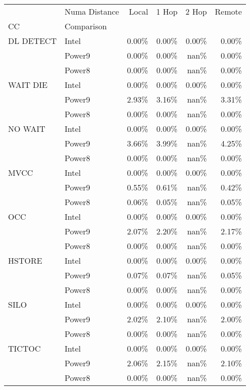 \begin{tabular}{llrrrr}
\toprule
       & Numa Distance &  Local &  1 Hop &  2 Hop &  Remote \\
CC & Comparison &        &        &        &         \\
\midrule
DL DETECT & Intel &  0.00\% &  0.00\% &  0.00\% &   0.00\% \\
       & Power9 &  0.00\% &  0.00\% &   nan\% &   0.00\% \\
       & Power8 &  0.00\% &  0.00\% &   nan\% &   0.00\% \\
WAIT DIE & Intel &  0.00\% &  0.00\% &  0.00\% &   0.00\% \\
       & Power9 &  2.93\% &  3.16\% &   nan\% &   3.31\% \\
       & Power8 &  0.00\% &  0.00\% &   nan\% &   0.00\% \\
NO WAIT & Intel &  0.00\% &  0.00\% &  0.00\% &   0.00\% \\
       & Power9 &  3.66\% &  3.99\% &   nan\% &   4.25\% \\
       & Power8 &  0.00\% &  0.00\% &   nan\% &   0.00\% \\
MVCC & Intel &  0.00\% &  0.00\% &  0.00\% &   0.00\% \\
       & Power9 &  0.55\% &  0.61\% &   nan\% &   0.42\% \\
       & Power8 &  0.06\% &  0.05\% &   nan\% &   0.05\% \\
OCC & Intel &  0.00\% &  0.00\% &  0.00\% &   0.00\% \\
       & Power9 &  2.07\% &  2.20\% &   nan\% &   2.17\% \\
       & Power8 &  0.00\% &  0.00\% &   nan\% &   0.00\% \\
HSTORE & Intel &  0.00\% &  0.00\% &  0.00\% &   0.00\% \\
       & Power9 &  0.07\% &  0.07\% &   nan\% &   0.05\% \\
       & Power8 &  0.00\% &  0.00\% &   nan\% &   0.00\% \\
SILO & Intel &  0.00\% &  0.00\% &  0.00\% &   0.00\% \\
       & Power9 &  2.02\% &  2.10\% &   nan\% &   2.00\% \\
       & Power8 &  0.00\% &  0.00\% &   nan\% &   0.00\% \\
TICTOC & Intel &  0.00\% &  0.00\% &  0.00\% &   0.00\% \\
       & Power9 &  2.06\% &  2.15\% &   nan\% &   2.10\% \\
       & Power8 &  0.00\% &  0.00\% &   nan\% &   0.00\% \\
\bottomrule
\end{tabular}
